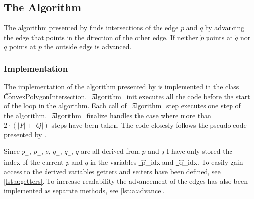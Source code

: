 \subsection*{The Algorithm}
	The algorithm presented by \citeauthor{o1982new} finds intersections of the edge $\dot{p}$ and $\dot{q}$ by advancing the edge that points in the direction of the other edge. If neither $\dot{p}$ points at $\dot{q}$ nor $\dot{q}$ points at $\dot{p}$ the outside edge is advanced.  

	\subsubsection*{Implementation}
	The implementation of the algorithm presented by \textcite{o1982new} is implemented in the class \t{ConvexPolygonIntersection}. \t{_algorithm_init} executes all the code before the start of the loop in the algorithm. Each call of \t{_algorithm_step} executes one step of the algorithm. \t{_algorithm_finalize} handles the case where more than $2 \cdot (|P| + |Q|)$ steps have been taken. The code closesly follows the pseudo code presented by \citeauthor{o1982new}.

	

	

	

	Since $p_+$, $p_-$, $\dot{p}$, $q_+$, $q_-$, $\dot{q}$ are all derived from $p$ and $q$ I have only stored the index of the current $p$ and $q$ in the variables \t{_p_idx} and \t{_q_idx}. To easily gain access to the derived variables getters and setters have been defined, see \autoref{lst:a:getters}. To increase readability the advancement of the edges has also been implemented as separate methods, see \autoref{lst:a:advance}.

	

